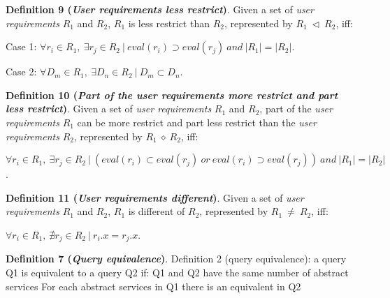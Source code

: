 \bigskip
\noindent \textbf{Definition 9 (\textsl{User requirements less restrict})}.
Given a set of \textsl{user requirements} $R_{1}$ and $R_{2}$, $R_{1}$ is less restrict than $R_{2}$, represented by $R_{1} \ \lhd \ R_{2}$, iff:
\begin{flushleft}
Case 1: $\forall r_{i} \in R_{1}, \ \exists r_{j} \in R_{2} \ \vert \ eval (r_{i}) \supset eval(r_{j}) \ and \ \vert R_{1} \vert = \vert R_{2} \vert$.
\end{flushleft}
\begin{flushleft}
Case 2: $\forall D_{m} \in R_{1}, \ \exists D_{n} \in R_{2} \ \vert \ D_{m} \subset D_{n}$. \\
\end{flushleft}

\bigskip
\noindent \textbf{Definition 10 (\textsl{Part of the user requirements more restrict and part less restrict})}.
Given a set of \textsl{user requirements} $R_{1}$ and $R_{2}$, part of the \textsl{user requirements} $R_{1}$ can be more restrict and part less restrict than the \textsl{user requirements} $R_{2}$, represented by $R_{1} \ \diamond \ R_{2}$, iff:
\begin{flushleft}
$\forall r_{i} \in R_{1}, \ \exists r_{j} \in R_{2} \ \vert \ (eval (r_{i}) \subset eval(r_{j}) \ or \ eval (r_{i}) \supset eval(r_{j})) \ and \ \vert R_{1} \vert = \vert R_{2} \vert$.
\end{flushleft}

\bigskip
\noindent \textbf{Definition 11 (\textsl{User requirements different})}.
Given a set of \textsl{user requirements} $R_{1}$ and $R_{2}$, $R_{1}$ is different of $R_{2}$, represented by $R_{1} \ \neq \ R_{2}$, iff:
\begin{flushleft}
$\forall r_{i} \in R_{1}, \ \nexists r_{j} \in R_{2} \ \vert \ r_{i}.x = r_{j}.x$.
\end{flushleft}

\bigskip
\noindent \textbf{Definition 7 (\textsl{Query equivalence})}.
Definition 2 (query equivalence): a query Q1 is equivalent to a query Q2 if: 
Q1 and Q2 have the same number of abstract services
For each abstract services in Q1 there is an equivalent in Q2

